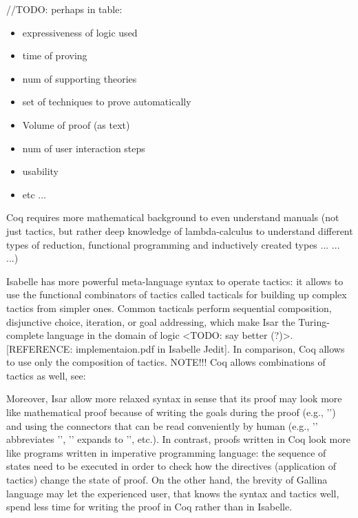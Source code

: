 \documentclass[article]{aaltoseries}
\begin{document}
//TODO: perhaps in table:
\begin{itemize}
	\itemsep0em
	\item expressiveness of logic used
	\item time of proving
	\item num of supporting theories
	\item set of techniques to prove automatically
	\item Volume of proof (as text)
	\item num of user interaction steps
	\item usability
	\item etc ...
\end{itemize}


Coq requires more mathematical background to even understand manuals (not just tactics, but rather deep knowledge of lambda-calculus to understand different types of reduction, functional programming and inductively created types ... ... ...)

Isabelle has more powerful meta-language syntax to operate tactics: it allows to use the functional combinators of tactics called tacticals for building up complex tactics from simpler ones. Common tacticals perform sequential composition, disjunctive choice, iteration, or goal addressing, which make Isar the Turing-complete language in the domain of logic <TODO: say better (?)>. [REFERENCE: implementaion.pdf in Isabelle Jedit]. In comparison, Coq allows to use only the composition of tactics. 
NOTE!!! Coq allows combinations of tactics as well, see: %

Moreover, Isar allow more relaxed syntax in sense that its proof may look more like mathematical proof because of writing the goals during the proof (e.g., '') and using the connectors that can be read conveniently by human (e.g., '' abbreviates '', '' expands to '', etc.). In contrast, proofs written in Coq look more like programs written in imperative programming language: the sequence of states need to be executed in order to check how the directives (application of tactics) change the state of proof. On the other hand, the brevity of Gallina language may let the experienced user, that knows the syntax and tactics well, spend less time for writing the proof in Coq rather than in Isabelle.
\end{document}
